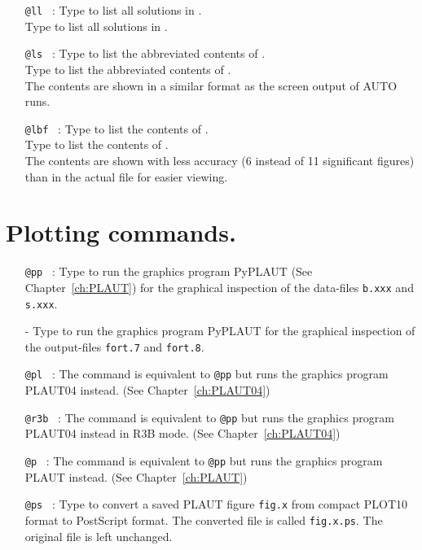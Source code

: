 \documentclass[12pt]{report}
\begin{document}
\begin{itemize}
\item[\tt @ll]~:
  Type  to list all solutions in .\\
  Type  to list all solutions in .

\item[\tt @ls]~:
  Type  to list the abbreviated contents of .\\
  Type  to list the abbreviated contents of .\\
  The contents are shown in a similar format as the screen output of
  AUTO runs.

\item[\tt @lbf]~:
  Type  to list the contents of .\\
  Type  to list the contents of .\\
  The contents are shown with less accuracy (6 instead of 11
  significant figures) than in the actual file for easier viewing.


\end{itemize}

\section{ Plotting commands.} 

\begin{itemize}

\item[\tt @pp]~:
  Type  to run the graphics program {\cal PyPLAUT}
  (See Chapter~\ref{ch:PLAUT})
  for the graphical inspection of the data-files 
  {\tt b.xxx} and {\tt s.xxx}. 
\item[-]
  Type  to run the graphics program {\cal PyPLAUT}
  for the graphical inspection of the output-files 
  {\tt fort.7} and {\tt fort.8}.

\item[\tt @pl]~:
  The command  is equivalent to {\tt @pp} but runs
  the graphics program {\cal PLAUT04} instead.
  (See Chapter~\ref{ch:PLAUT04})

\item[\tt @r3b]~:
  The command  is equivalent to {\tt @pp} but runs
  the graphics program {\cal PLAUT04} instead in R3B mode.
  (See Chapter~\ref{ch:PLAUT04})

\item[\tt @p]~:
  The command  is equivalent to {\tt @pp} but runs
  the graphics program {\cal PLAUT} instead.
  (See Chapter~\ref{ch:PLAUT})

\item[\tt @ps]~:
  Type  to convert a saved {\cal PLAUT} figure {\tt fig.x}
  from compact {\cal PLOT10} format to {\cal PostScript} format.
  The converted file is called {\tt fig.x.ps}. 
  The original file is left unchanged.

\end{itemize}
\end{document}
